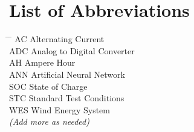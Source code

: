 \newpage
\chapter*{List of Abbreviations}
\begin{tabbing}
    \hspace*{2cm} \= \hspace*{4cm} \= \kill
    AC \> Alternating Current \\
    ADC \> Analog to Digital Converter \\
    AH \> Ampere Hour \\
    ANN \> Artificial Neural Network \\
    SOC \> State of Charge \\
    STC \> Standard Test Conditions \\
    WES \> Wind Energy System \\
    \textit{(Add more as needed)} \\
\end{tabbing}
